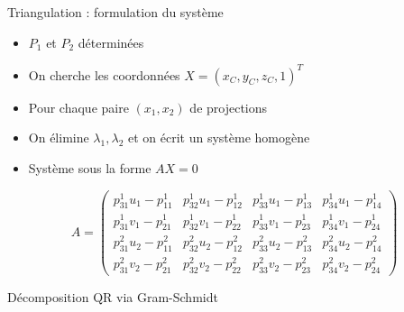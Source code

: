 \begin{frame}{Triangulation : formulation du système}
\vspace*{-0.5em}
\begin{itemize}
  \item<1-> \( P_1 \) et \( P_2 \) déterminées
  \item<2-> On cherche les coordonnées \( X = (x_C, y_C, z_C, 1)^T \)
  \item<3-> Pour chaque paire \( (x_1, x_2) \) de projections
  \item<4-> On élimine \( \lambda_1, \lambda_2 \) et on écrit un système homogène
  \item<5-> Système sous la forme \( A X = 0 \)
\end{itemize}

\vspace{1em}

\pause
\pause
\pause
\pause
\begin{center}
\scriptsize
\[
A =
\left(
\begin{array}{cccc}
p_{31}^{1} u_1 - p_{11}^{1} & p_{32}^{1} u_1 - p_{12}^{1} & p_{33}^{1} u_1 - p_{13}^{1} & p_{34}^{1} u_1 - p_{14}^{1} \\
p_{31}^{1} v_1 - p_{21}^{1} & p_{32}^{1} v_1 - p_{22}^{1} & p_{33}^{1} v_1 - p_{23}^{1} & p_{34}^{1} v_1 - p_{24}^{1} \\
p_{31}^{2} u_2 - p_{11}^{2} & p_{32}^{2} u_2 - p_{12}^{2} & p_{33}^{2} u_2 - p_{13}^{2} & p_{34}^{2} u_2 - p_{14}^{2} \\
p_{31}^{2} v_2 - p_{21}^{2} & p_{32}^{2} v_2 - p_{22}^{2} & p_{33}^{2} v_2 - p_{23}^{2} & p_{34}^{2} v_2 - p_{24}^{2}
\end{array}
\right)
\]
\vspace*{1cm}
\end{center}
\end{frame}



\begin{frame}
    \scriptsize
    \begin{algorithm}[H]
\DontPrintSemicolon
{}
\BlankLine

\caption{Décomposition QR via Gram-Schmidt}
\end{algorithm}
\end{frame}

